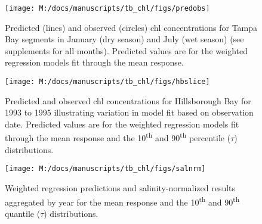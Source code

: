 \documentclass{svjour3}\usepackage[]{graphicx}\usepackage[]{color}
\begin{document}
\begin{figure}[!ht]


{\centering \texttt{[image: M:/docs/manuscripts/tb\_chl/figs/predobs]} 

}

\caption[Predicted (lines) and observed (circles) \ac{chl} concentrations for Tampa Bay segments in January (dry season) and July (wet season) (see supplements for all months)]{Predicted (lines) and observed (circles) \ac{chl} concentrations for Tampa Bay segments in January (dry season) and July (wet season) (see supplements for all months).  Predicted values are for the weighted regression models fit through the mean response.\label{fig:predobs}}
\end{figure}



\begin{figure}[!ht]


{\centering \texttt{[image: M:/docs/manuscripts/tb\_chl/figs/hbslice]} 

}

\caption[Predicted and observed \ac{chl} concentrations for Hillsborough Bay for 1993 to 1995 illustrating variation in model fit based on observation date]{Predicted and observed \ac{chl} concentrations for Hillsborough Bay for 1993 to 1995 illustrating variation in model fit based on observation date. Predicted values are for the weighted regression models fit through the mean response and the 10\textsuperscript{th} and 90\textsuperscript{th} percentile ($\tau$) distributions.\label{fig:hbslice}}
\end{figure}



\begin{figure}[!ht]


{\centering \texttt{[image: M:/docs/manuscripts/tb\_chl/figs/salnrm]} 

}

\caption[Weighted regression predictions and salinity-normalized results aggregated by year for the mean response and the 10\textsuperscript{th} and 90\textsuperscript{th} quantile ($\tau$) distributions]{Weighted regression predictions and salinity-normalized results aggregated by year for the mean response and the 10\textsuperscript{th} and 90\textsuperscript{th} quantile ($\tau$) distributions.\label{fig:salnrm}}
\end{figure}
\end{document}
